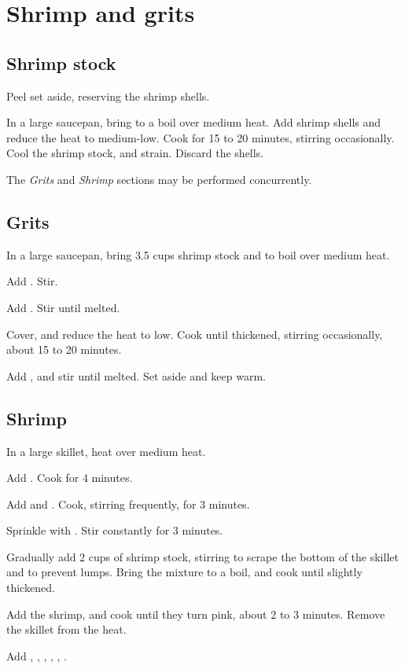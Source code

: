 \section{Shrimp and grits}

\subsection*{Shrimp stock}

Peel  set aside, reserving the shrimp shells.

In a large saucepan, bring  to a boil over medium heat.
Add shrimp shells and reduce the heat to medium-low.
Cook for 15 to 20 minutes, stirring occasionally.
Cool the shrimp stock, and strain.
Discard the shells.

The {\it Grits} and {\it Shrimp} sections may be performed concurrently.

\subsection*{Grits}

In a large saucepan, bring 3.5 cups shrimp stock and 
 to boil over medium heat.

Add .
Stir.

Add .
Stir until melted.

Cover, and reduce the heat to low.
Cook until thickened, stirring occasionally, about 15 to 20 minutes.

Add , and stir until melted.
Set aside and keep warm.

\subsection*{Shrimp}

In a large skillet, heat  over medium heat.

Add .
Cook for 4 minutes.

Add  and .
Cook, stirring frequently, for 3 minutes.

Sprinkle with .
Stir constantly for 3 minutes.

Gradually add 2 cups of shrimp stock, stirring to scrape the bottom of the skillet and to prevent lumps. Bring the mixture to a boil, and cook until slightly thickened.

Add the shrimp, and cook until they turn pink, about 2 to 3 minutes.
Remove the skillet from the heat.

Add , ,
, , 
, .
